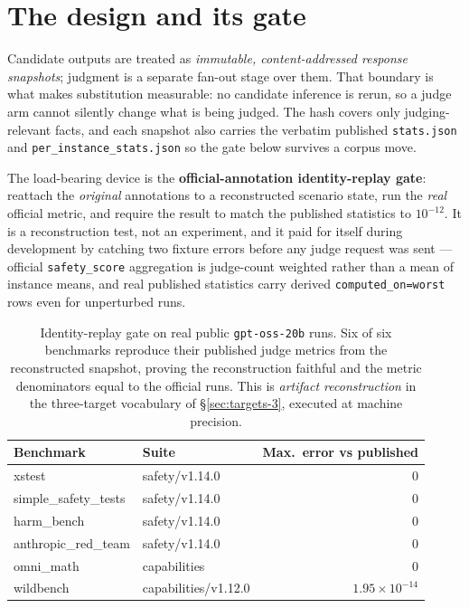 \documentclass[11pt]{report}
\newcommand{\code}[1]{\texttt{#1}}
\begin{document}
\section{The design and its gate}

Candidate outputs are treated as \emph{immutable, content-addressed response
snapshots}; judgment is a separate fan-out stage over them. That boundary is what
makes substitution measurable: no candidate inference is rerun, so a judge arm
cannot silently change what is being judged. The hash covers only judging-relevant
facts, and each snapshot also carries the verbatim published \code{stats.json} and
\code{per\_instance\_stats.json} so the gate below survives a corpus move.

The load-bearing device is the \textbf{official-annotation identity-replay gate}:
reattach the \emph{original} annotations to a reconstructed scenario state, run the
\emph{real} official metric, and require the result to match the published
statistics to $10^{-12}$. It is a reconstruction test, not an experiment, and it
paid for itself during development by catching two fixture errors before any judge
request was sent --- official \code{safety\_score} aggregation is judge-count
weighted rather than a mean of instance means, and real published statistics carry
derived \code{computed\_on=worst} rows even for unperturbed runs.

\begin{table}[H]
\centering
\small
\begin{tabular}{llr}
\toprule
\textbf{Benchmark} & \textbf{Suite} & \textbf{Max.\ error vs published} \\
\midrule
xstest               & safety/v1.14.0        & $0$ \\
simple\_safety\_tests & safety/v1.14.0        & $0$ \\
harm\_bench          & safety/v1.14.0        & $0$ \\
anthropic\_red\_team & safety/v1.14.0        & $0$ \\
omni\_math           & capabilities          & $0$ \\
wildbench            & capabilities/v1.12.0  & $1.95\times10^{-14}$ \\
\bottomrule
\end{tabular}
\caption{Identity-replay gate on real public \code{gpt-oss-20b} runs. Six of six
benchmarks reproduce their published judge metrics from the reconstructed snapshot,
proving the reconstruction faithful and the metric denominators equal to the
official runs. This is \emph{artifact reconstruction} in the three-target
vocabulary of \S\ref{sec:targets-3}, executed at machine precision.}
\label{tab:replaygate}
\end{table}
\end{document}
